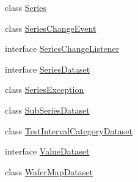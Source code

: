 \begin{DoxyCompactItemize}
\item 
class \mbox{\hyperlink{classorg_1_1jfree_1_1data_1_1general_1_1_series}{Series}}
\item 
class \mbox{\hyperlink{classorg_1_1jfree_1_1data_1_1general_1_1_series_change_event}{Series\+Change\+Event}}
\item 
interface \mbox{\hyperlink{interfaceorg_1_1jfree_1_1data_1_1general_1_1_series_change_listener}{Series\+Change\+Listener}}
\item 
interface \mbox{\hyperlink{interfaceorg_1_1jfree_1_1data_1_1general_1_1_series_dataset}{Series\+Dataset}}
\item 
class \mbox{\hyperlink{classorg_1_1jfree_1_1data_1_1general_1_1_series_exception}{Series\+Exception}}
\item 
class \mbox{\hyperlink{classorg_1_1jfree_1_1data_1_1general_1_1_sub_series_dataset}{Sub\+Series\+Dataset}}
\item 
class \mbox{\hyperlink{classorg_1_1jfree_1_1data_1_1general_1_1_test_interval_category_dataset}{Test\+Interval\+Category\+Dataset}}
\item 
interface \mbox{\hyperlink{interfaceorg_1_1jfree_1_1data_1_1general_1_1_value_dataset}{Value\+Dataset}}
\item 
class \mbox{\hyperlink{classorg_1_1jfree_1_1data_1_1general_1_1_wafer_map_dataset}{Wafer\+Map\+Dataset}}
\end{DoxyCompactItemize}
